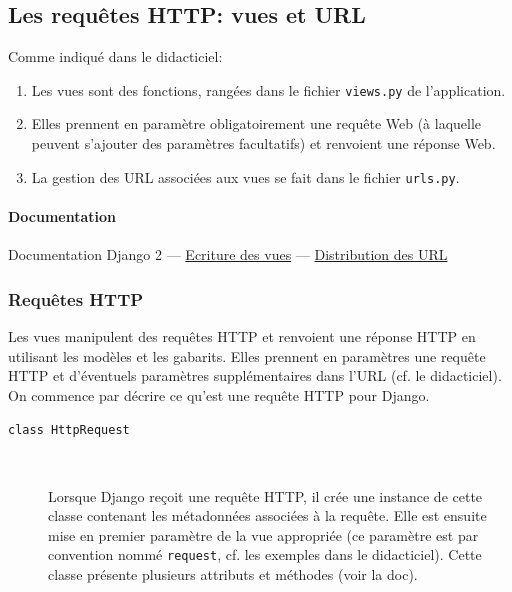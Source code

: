 \documentclass[a4paper, 10pt]{article}
\begin{document}
{\subsection{Les requêtes HTTP: vues et URL}
Comme indiqué dans le didacticiel:
\begin{enumerate}
    \item Les vues sont des fonctions, rangées dans le fichier \texttt{views.py} de l'application.
    \item Elles prennent en paramètre obligatoirement une requête Web (à laquelle peuvent s'ajouter des paramètres facultatifs) et renvoient une réponse Web.
    \item La gestion des URL associées aux vues se fait dans le fichier \texttt{urls.py}.
\end{enumerate}

\paragraph{Documentation} Documentation Django 2 --- \href{https://docs.djangoproject.com/fr/2.0/topics/http/views/}{Ecriture des vues} ---  \href{https://docs.djangoproject.com/fr/2.0/topics/http/urls/}{Distribution des URL}

\subsubsection{Requêtes HTTP}
Les  vues manipulent des requêtes HTTP et renvoient une réponse HTTP en utilisant les modèles et les gabarits. Elles prennent en paramètres une requête HTTP et d'éventuels paramètres supplémentaires dans l'URL (cf. le didacticiel). On commence par décrire ce qu'est une requête HTTP pour Django.

\begin{description}
    \item[\texttt{class HttpRequest}]~

    Lorsque Django reçoit une requête HTTP, il crée une instance de cette classe contenant les métadonnées associées à la requête. Elle est ensuite mise en premier paramètre de la vue appropriée (ce paramètre est par convention nommé \texttt{request}, cf. les exemples dans le didacticiel). Cette classe présente plusieurs attributs et méthodes (voir la doc).
\end{description}

}
\end{document}
